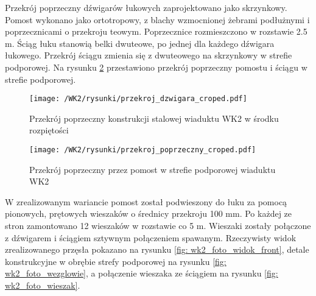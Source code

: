  Przekrój poprzeczny dźwigarów łukowych zaprojektowano jako skrzynkowy. Pomost wykonano jako ortotropowy, z blachy wzmocnionej żebrami podłużnymi i poprzecznicami o przekroju teowym. Poprzecznice rozmieszczono w rozstawie 2.5 m. Ściąg łuku stanowią belki dwuteowe, po jednej dla każdego dźwigara łukowego. Przekrój ściągu zmienia się z dwuteowego na skrzynkowy w strefie podporowej. Na rysunku \ref{fig: wk2_cross_sect_deck} przestawiono przekrój poprzeczny pomostu i ściągu w strefie podporowej. 
  \begin{figure}[hbt!]
 	\centering
 	\texttt{[image: /WK2/rysunki/przekroj\_dzwigara\_croped.pdf]}
 	\captionsetup{justification=centering}
 	\caption{Przekrój poprzeczny konstrukcji stalowej wiaduktu WK2 w środku rozpiętości}
 	\label{fig: wk2_cross_sect}
 \end{figure}
 \begin{figure}[h]
 	\centering
 	\texttt{[image: /WK2/rysunki/przekroj\_poprzeczny\_croped.pdf]}
 	\captionsetup{justification=centering}
 	\caption{Przekrój poprzeczny przez pomost w strefie podporowej wiaduktu WK2}
 	\label{fig: wk2_cross_sect_deck}
 \end{figure}
 
 W zrealizowanym wariancie pomost został podwieszony do łuku za pomocą pionowych, prętowych wieszaków o średnicy przekroju 100 mm. Po każdej ze stron zamontowano 12 wieszaków w rozstawie co 5 m. Wieszaki zostały połączone z dźwigarem i ściągiem sztywnym połączeniem spawanym. Rzeczywisty widok zrealizowanego przęsła pokazano na rysunku \ref{fig: wk2_foto_widok_front}, detale konstrukcyjne w obrębie strefy podporowej na rysunku \ref{fig:  wk2_foto_wezglowie}, a połączenie wieszaka ze ściągiem na rysunku \ref{fig: wk2_foto_wieszak}.

